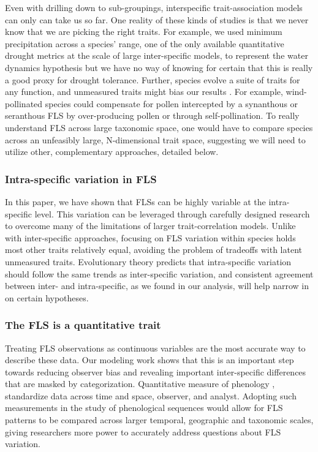 \documentclass[12pt]{article}
\begin{document}
\indent Even with drilling down to sub-groupings, interspecific trait-association models can only can take us so far. One reality of these kinds of studies is that we never know that we are picking the right traits. For example, we used minimum precipitation across a species' range, one of the only available quantitative drought metrics at the scale of large inter-specific models, to represent the water dynamics hypothesis but we have no way of knowing for certain that this is really a good proxy for drought tolerance. Further, species evolve a suite of traits for any function, and unmeasured traits might bias our results \citep{Davies2019}. For example, wind-pollinated species could compensate for pollen intercepted by a synanthous or seranthous FLS by over-producing pollen or through self-pollination. To really understand FLS across large taxonomic space, one would have to compare species across an unfeasibly large, N-dimensional trait space, suggesting we will need to utilize other, complementary approaches, detailed below.

\subsubsection*{Intra-specific variation in FLS}
\indent\indent In this paper, we have shown that FLSs can be highly variable at the intra-specific level. This variation can be leveraged through carefully designed research to overcome many of the limitations of larger trait-correlation models. Unlike with inter-specific approaches, focusing on FLS variation within species holds most other traits relatively equal, avoiding the problem of tradeoffs with latent unmeasured traits. Evolutionary theory predicts that intra-specific variation should follow the same trends as inter-specific variation, and consistent agreement between inter- and intra-specific, as we found in our analysis, will help narrow in on certain hypotheses.\\
\subsubsection*{The FLS is a quantitative trait}
\indent \indent Treating FLS observations as continuous variables are the most accurate way to describe these data. Our modeling work shows that this is an important step towards reducing observer bias and revealing important inter-specific differences that are masked by categorization. Quantitative measure of phenology \citep[e.g. the BBCH scale,][]{Finn2007}, standardize data across time and space, observer, and analyst. Adopting such measurements in the study of phenological sequences would allow for FLS patterns to be compared across larger temporal, geographic and taxonomic scales, giving researchers more power to accurately address questions about FLS variation.
\end{document}
